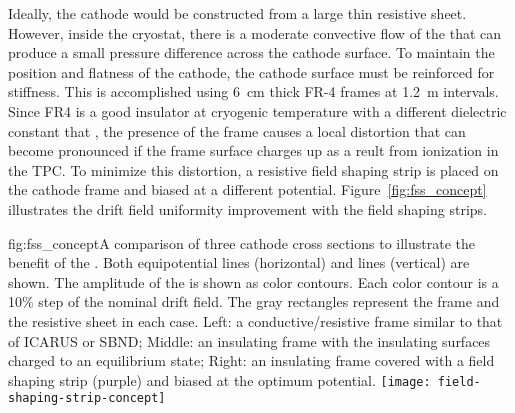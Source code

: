 Ideally, the cathode would be constructed from a large thin resistive sheet.  However, inside the cryostat, there is a moderate convective flow of the \lar that can produce a small pressure difference across the cathode surface.  To maintain the position and flatness of the cathode, the cathode surface must be reinforced for stiffness.  This is accomplished using \SI{6}{cm} thick FR-4 frames at \SI{1.2}{m} intervals. Since FR4 is a good insulator at cryogenic temperature with a different dielectric constant that \lar, the presence of the frame causes a local \efield distortion that can become pronounced if the frame surface charges up as a reult from ionization in the TPC.  To minimize this distortion, a resistive field shaping strip is placed on the cathode frame and biased at a different potential.  Figure~\ref{fig:fss_concept} illustrates the drift field uniformity improvement with the field shaping strips.

\begin{dunefigure}{fig:fss_concept}{A comparison of three cathode cross sections to illustrate the benefit of the . Both equipotential lines (horizontal) and \efield{} lines (vertical) are shown.  The amplitude of the \efield{} is shown as color contours. Each color contour is a 10\% step of the nominal drift field.  The gray rectangles represent the frame and the resistive sheet in each case. Left: a conductive/resistive frame similar to that of ICARUS or SBND; Middle: an insulating frame with the insulating surfaces charged to an equilibrium state; Right: an insulating frame covered with a field shaping strip (purple) and biased at the optimum potential. }
\texttt{[image: field-shaping-strip-concept]} %
\end{dunefigure}

